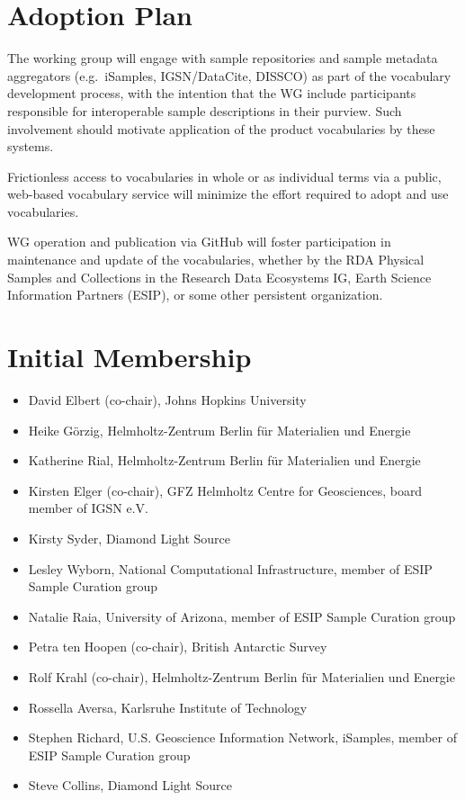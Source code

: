 \documentclass{scrartcl}
\begin{document}
\section{Adoption Plan}

The working group will engage with sample repositories and sample
metadata aggregators (e.g.\ iSamples, IGSN/DataCite, DISSCO) as part
of the vocabulary development process, with the intention that the WG
include participants responsible for interoperable sample descriptions
in their purview.  Such involvement should motivate application of the
product vocabularies by these systems.

Frictionless access to vocabularies in whole or as individual terms
via a public, web-based vocabulary service will minimize the effort
required to adopt and use vocabularies.

WG operation and publication via GitHub will foster participation in
maintenance and update of the vocabularies, whether by the RDA
Physical Samples and Collections in the Research Data Ecosystems IG,
Earth Science Information Partners (ESIP), or some other persistent
organization.

\section{Initial Membership}

\begin{itemize}
\item David Elbert (co-chair), Johns Hopkins University
\item Heike Görzig,
  Helmholtz-Zentrum Berlin für Materialien und Energie
\item Katherine Rial,
  Helmholtz-Zentrum Berlin für Materialien und Energie
\item Kirsten Elger (co-chair),
  GFZ Helmholtz Centre for Geosciences, board member of IGSN e.V.
\item Kirsty Syder, Diamond Light Source
\item Lesley Wyborn,
  National Computational Infrastructure, member of ESIP Sample Curation group
\item Natalie Raia,
  University of Arizona, member of ESIP Sample Curation group
\item Petra ten Hoopen (co-chair), British Antarctic Survey
\item Rolf Krahl (co-chair),
  Helmholtz-Zentrum Berlin für Materialien und Energie
\item Rossella Aversa, Karlsruhe Institute of Technology
\item Stephen Richard,
  U.S. Geoscience Information Network, iSamples,
  member of ESIP Sample Curation group
\item Steve Collins, Diamond Light Source
\end{itemize}
\end{document}
